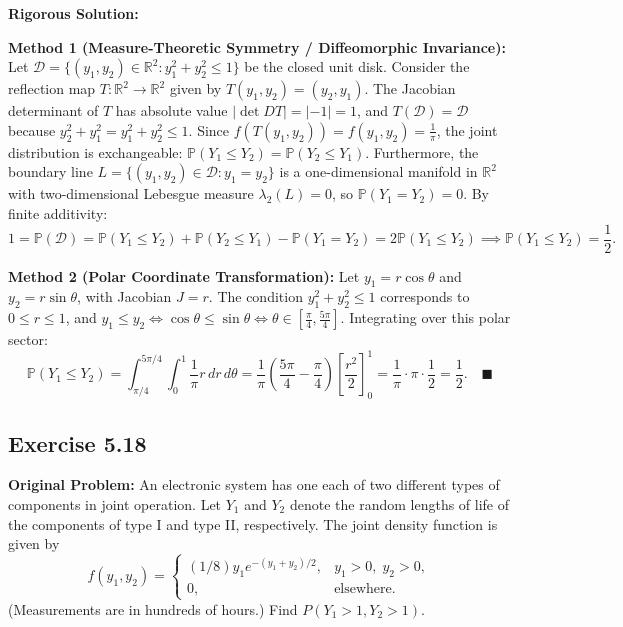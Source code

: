\documentclass[11pt, letterpaper]{article}
\theoremstyle{definition}
\theoremstyle{remark}
\newcommand{\Prob}{\mathbb{P}}
\begin{document}
\textbf{Rigorous Solution:}

\textbf{Method 1 (Measure-Theoretic Symmetry / Diffeomorphic Invariance):}
Let $\mathcal{D} = \{(y_1, y_2) \in \mathbb{R}^2 : y_1^2 + y_2^2 \le 1\}$ be the closed unit disk. Consider the reflection map $T : \mathbb{R}^2 \to \mathbb{R}^2$ given by $T(y_1, y_2) = (y_2, y_1)$. The Jacobian determinant of $T$ has absolute value $|\det DT| = |-1| = 1$, and $T(\mathcal{D}) = \mathcal{D}$ because $y_2^2 + y_1^2 = y_1^2 + y_2^2 \le 1$. Since $f(T(y_1, y_2)) = f(y_1, y_2) = \frac{1}{\pi}$, the joint distribution is exchangeable: $\Prob(Y_1 \le Y_2) = \Prob(Y_2 \le Y_1)$. Furthermore, the boundary line $L = \{(y_1, y_2) \in \mathcal{D} : y_1 = y_2\}$ is a one-dimensional manifold in $\mathbb{R}^2$ with two-dimensional Lebesgue measure $\lambda_2(L) = 0$, so $\Prob(Y_1 = Y_2) = 0$. By finite additivity:
\[ 1 = \Prob(\mathcal{D}) = \Prob(Y_1 \le Y_2) + \Prob(Y_2 \le Y_1) - \Prob(Y_1 = Y_2) = 2\Prob(Y_1 \le Y_2) \implies \Prob(Y_1 \le Y_2) = \frac{1}{2}. \]

\textbf{Method 2 (Polar Coordinate Transformation):}
Let $y_1 = r \cos \theta$ and $y_2 = r \sin \theta$, with Jacobian $J = r$. The condition $y_1^2 + y_2^2 \le 1$ corresponds to $0 \le r \le 1$, and $y_1 \le y_2 \iff \cos \theta \le \sin \theta \iff \theta \in \left[\frac{\pi}{4}, \frac{5\pi}{4}\right]$. Integrating over this polar sector:
\[ \Prob(Y_1 \le Y_2) = \int_{\pi/4}^{5\pi/4} \int_0^1 \frac{1}{\pi} r \, dr \, d\theta = \frac{1}{\pi} \left( \frac{5\pi}{4} - \frac{\pi}{4} \right) \left[ \frac{r^2}{2} \right]_0^1 = \frac{1}{\pi} \cdot \pi \cdot \frac{1}{2} = \frac{1}{2}. \quad \blacksquare \]

\subsection{Exercise 5.18}

\textbf{Original Problem:}
An electronic system has one each of two different types of components in joint operation. Let $Y_1$ and $Y_2$ denote the random lengths of life of the components of type I and type II, respectively. The joint density function is given by
\[ f(y_1, y_2) = \begin{cases} (1/8)y_1 e^{-(y_1+y_2)/2}, & y_1 > 0, \; y_2 > 0, \\ 0, & \text{elsewhere.} \end{cases} \]
(Measurements are in hundreds of hours.) Find $P(Y_1 > 1, Y_2 > 1)$.
\end{document}
